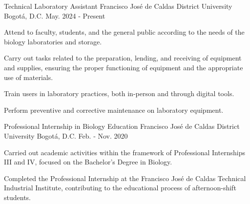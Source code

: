 


\begin{cventries}


\cventry
{Technical Laboratory Assistant} %
{Francisco José de Caldas District University} %
{Bogotá, D.C.} %
{May. 2024 ‑ Present} %
{ %
\begin{cvitems}
\item {Attend to faculty, students, and the general public according to the needs of the biology laboratories and storage.}
\item {Carry out tasks related to the preparation, lending, and receiving of equipment and supplies, ensuring the proper functioning of equipment and the appropriate use of materials.}
\item {Train users in laboratory practices, both in-person and through digital tools.}
\item {Perform preventive and corrective maintenance on laboratory equipment.}
\end{cvitems}
}


\cventry
{Professional Internship in Biology Education} %
{Francisco José de Caldas District University} %
{Bogotá, D.C.} %
{Feb. ‑ Nov. 2020} %
{ %
\begin{cvitems}
\item {Carried out academic activities within the framework of Professional Internships III and IV, focused on the Bachelor’s Degree in Biology.}
\item {Completed the Professional Internship at the Francisco José de Caldas Technical Industrial Institute, contributing to the educational process of afternoon-shift students.}
\end{cvitems}
}


\end{cventries}
